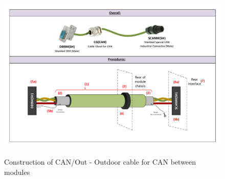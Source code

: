 \begin{figure}
  \centering
  \includegraphics[angle=90,width=1\columnwidth]{figs/body03/FIGCANOutconstruction.pdf}\\
  \caption[Construction of CAN/Out - Outdoor cable for CAN between modules]{Construction of CAN/Out - Outdoor cable for CAN between modules}
  \label{FIG:CANOutconstruction}
\end{figure}
